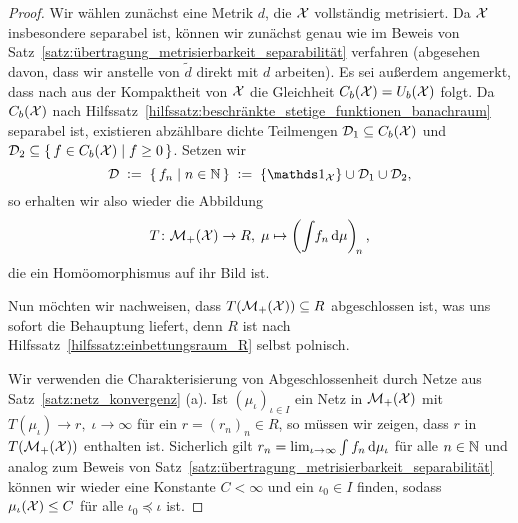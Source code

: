 \documentclass[../main/main.tex]{subfiles}
\begin{document}
	\begin{proof}
		Wir wählen zunächst eine Metrik $d$, die $\mathcal{X}$ vollständig metrisiert. Da $\mathcal{X}$ insbesondere separabel ist, können wir zunächst genau wie 
		im Beweis von Satz~\ref{satz:übertragung_metrisierbarkeit_separabilität} verfahren
		(abgesehen davon, dass wir anstelle von $\tilde{d}$ direkt mit $d$ arbeiten). Es sei außerdem angemerkt, dass nach \cite[Satz 2.4.1]{Simon.2015} aus der Kompaktheit von $\mathcal{X}$ die Gleichheit $C_b(\mathcal{X}) = U_b(\mathcal{X})$ folgt. Da $C_b(\mathcal{X})$ nach Hilfssatz~\ref{hilfssatz:beschränkte_stetige_funktionen_banachraum} separabel ist, existieren abzählbare dichte Teilmengen $\mathcal{D}_1 \subseteq C_b(\mathcal{X})$ und $\mathcal{D}_2 \subseteq \left\{\, f \in C_b(\mathcal{X}) \; \middle| \; f \geq 0 \,\right\}$. Setzen wir 
		\[ \mathcal{D} \; \defby \; \setcomp{f_n}{n \in \N} \; \defby \; \set{\indfct_\X} \cup \mathcal{D}_1 \cup \mathcal{D}_2 \text{,} \] 
		so erhalten wir also wieder die Abbildung
		\[ T \colon \mathcal{M}_{+}(\mathcal{X}) \to R, \; \mu \mapsto \left( \int_{} \, f_n \, \mathrm{d}\mu \right)_{\! n}  \text{,} \]
		die ein Homöomorphismus auf ihr Bild ist. 
		
		Nun möchten wir nachweisen, dass $T(\mathcal{M}_{+}(\mathcal{X})) \subseteq R$ abgeschlossen ist, was uns sofort die Behauptung liefert, denn $R$ ist nach Hilfssatz~\ref{hilfssatz:einbettungsraum_R} selbst polnisch.
		
		Wir verwenden die Charakterisierung von Abgeschlossenheit 
		durch Netze aus Satz~\ref{satz:netz_konvergenz} (a). Ist $(\mu_\iota)_{\iota \in I}$ ein Netz in $\mathcal{M}_{+}(\mathcal{X})$ mit $T(\mu_\iota) \to r, \; \iota \to \infty$
		für ein $r = (r_n)_n \in R$, so müssen wir zeigen, dass $r$ in $T(\mathcal{M}_{+}(\mathcal{X}))$ enthalten ist. Sicherlich gilt
		$r_n = \lim_{\iota \to \infty} \int_{} \, f_n \, \mathrm{d}\mu_\iota$ für alle $n \in \mathbb{N}$ und analog zum Beweis von Satz~\ref{satz:übertragung_metrisierbarkeit_separabilität} 
		können wir wieder eine Konstante $C < \infty$ und ein $\iota_0 \in I$ finden, sodass $\mu_\iota(\mathcal{X}) \leq C$ für alle $\iota_0 \preceq \iota$ ist.
		

\end{proof}
\end{document}
